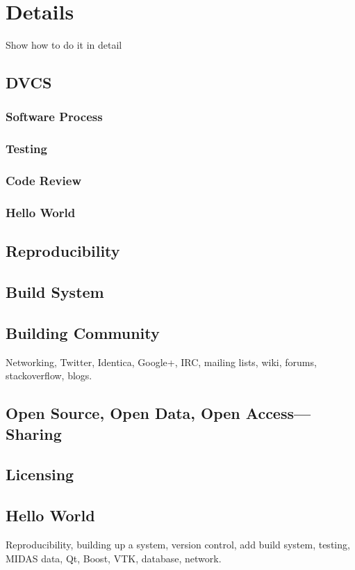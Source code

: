 \chapter{Details}

Show how to do it in detail

\section{DVCS}

\subsection{Software Process}

\subsection{Testing}

\subsection{Code Review}

\subsection{Hello World}

\section{Reproducibility}

\section{Build System}

\section{Building Community}

Networking, Twitter, Identica, Google+, IRC, mailing lists, wiki, forums, stackoverflow, blogs.

\section{Open Source, Open Data, Open Access---Sharing}

\section{Licensing}

\section{Hello World}

Reproducibility, building up a system, version control, add build system, testing, MIDAS data,
Qt, Boost, VTK, database, network.
